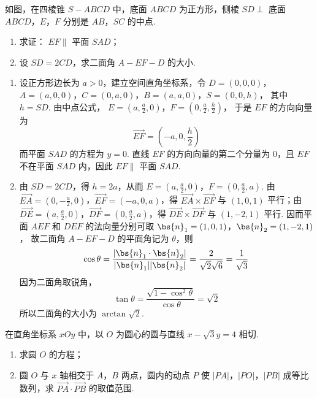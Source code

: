 \begin{problem}
如图，在四棱锥 \(S - ABCD\) 中，底面 \(ABCD\) 为正方形，侧棱 \(SD \perp\) 底面 \(ABCD\)，\(E\)，\(F\) 分别是 \(AB\)，\(SC\) 的中点.
\begin{enumerate}
\item 求证： \(EF\parallel\) 平面 \(SAD\)；
\item 设 \(SD = 2CD\)，求二面角 \(A - EF - D\) 的大小.
\end{enumerate}
\end{problem}

\begin{solution}
\begin{enumerate}
\item 设正方形边长为 \(a>0\)，建立空间直角坐标系，令
\(D=(0,0,0)\)，\(A=(a,0,0)\)，\(C=(0,a,0)\)，\(B=(a,a,0)\)，\(S=(0,0,h)\)，
其中 \(h=SD\). 由中点公式，
\(E=\left(a,\frac a2,0\right)\)，\(F=\left(0,\frac a2,\frac h2\right)\)，
于是 \(EF\) 的方向向量为
\[
\overrightarrow{EF}=\left(-a,0,\frac h2\right)
\]
而平面 \(SAD\) 的方程为 \(y=0\). 直线 \(EF\) 的方向向量的第二个分量为 \(0\)，且 \(EF\) 不在平面 \(SAD\) 内，因此 \(EF\parallel\) 平面 \(SAD\).

\item 由 \(SD=2CD\)，得 \(h=2a\)，从而
\(E=(a,\tfrac a2,0)\)，\(F=(0,\tfrac a2,a)\).
由 \(\overrightarrow{EA}=(0,-\frac a2,0)\)，\(\overrightarrow{EF}=(-a,0,a)\)，得 \(\overrightarrow{EA}\times\overrightarrow{EF}\) 与 \((1,0,1)\) 平行；由 \(\overrightarrow{DE}=(a,\frac a2,0)\)，\(\overrightarrow{DF}=(0,\frac a2,a)\)，得 \(\overrightarrow{DE}\times\overrightarrow{DF}\) 与 \((1,-2,1)\) 平行. 因而平面 \(AEF\) 和 \(DEF\) 的法向量分别可取
\(\bs{n}_1=(1,0,1)\)，\(\bs{n}_2=(1,-2,1)\)，
故二面角 \(A-EF-D\) 的平面角记为 \(\theta\)，则
\[
\cos\theta=\frac{|\bs{n}_1\cdot\bs{n}_2|}{|\bs{n}_1||\bs{n}_2|}
=\frac{2}{\sqrt2\sqrt6}=\frac1{\sqrt3}
\]
因为二面角取锐角，
\[
\tan\theta=\frac{\sqrt{1-\cos^2\theta}}{\cos\theta}=\sqrt2
\]
所以二面角的大小为 \(\arctan\sqrt2\).
\end{enumerate}
\end{solution}

\begin{problem}
在直角坐标系 \(xOy\) 中，以 \(O\) 为圆心的圆与直线 \(x - \sqrt{3} y = 4\) 相切.
\begin{enumerate}
\item 求圆 \(O\) 的方程；
\item 圆 \(O\) 与 \(x\) 轴相交于 \(A\)，\(B\) 两点，圆内的动点 \(P\) 使 \(\left|PA\right|\)，\(\left|PO\right|\)，\(\left|PB\right|\) 成等比数列，求 \(\overrightarrow{PA} \cdot \overrightarrow{PB}\) 的取值范围.
\end{enumerate}
\end{problem}

